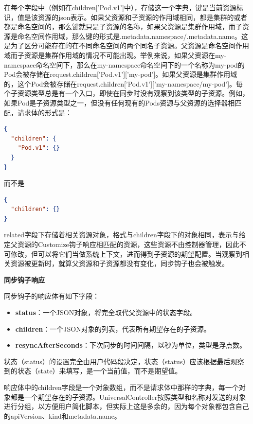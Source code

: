 \documentclass[macfonts,master]{njuthesis}
\begin{document}
在每个字段中（例如在children['Pod.v1']中），存储这一个字典，键是当前资源标识，值是该资源的json表示。如果父资源和子资源的作用域相同，都是集群的或者都是命名空间的，那么键就只是子资源的名称，如果父资源是集群作用域，而子资源是命名空间作用域，那么键的形式是{.metadata.namespace}/{.metadata.name}。这是为了区分可能存在的在不同命名空间的两个同名子资源。父资源是命名空间作用域而子资源是集群作用域的情况不可能出现。举例来说，如果父资源在my-namespace命名空间下，那么在my-namespace命名空间下的一个名称为my-pod的Pod会被存储在request.children['Pod.v1']['my-pod']。如果父资源是集群作用域的，这个Pod会被存储在request.children['Pod.v1']['my-namespace/my-pod']。每个子资源类型总是有一个入口，即使在同步时没有观察到该类型的子资源。例如，如果Pod是子资源类型之一，但没有任何现有的Pods资源与父资源的选择器相匹配，请求体的形式是：
\begin{lstlisting}[language=json,caption=请求体,label=listing:7]
{
  "children": {
    "Pod.v1": {}
  }
}
\end{lstlisting}
而不是
\begin{lstlisting}[language=json,caption=异常请求体,label=listing:8]
{
  "children": {}
}
\end{lstlisting}

related字段下存储着相关资源对象，格式与children字段下的对象相同，表示与给定父资源的Customize钩子响应相匹配的资源，这些资源不由控制器管理，因此不可修改，但可以将它们当做系统上下文，进而得到子资源的期望配置。当观察到相关资源被更新时，就算父资源和子资源都没有变化，同步钩子也会被触发。

\textbf{同步钩子响应}

同步钩子的响应体有如下字段：

\begin{itemize}
	\item \textbf{status}：一个JSON对象，将完全取代父资源中的状态字段。
	\item \textbf{children}：一个JSON对象的列表，代表所有期望存在的子资源。
	\item \textbf{resyncAfterSeconds}：下次同步的时间间隔，以秒为单位，类型是浮点数。
\end{itemize}

状态（status）的设置完全由用户代码段决定，状态（status）应该根据最后观察到的状态（state）来填写，是一个当前值，而不是期望值。

响应体中的children字段是一个对象数组，而不是请求体中那样的字典，每一个对象都是一个期望存在的子资源。UniversalController按照类型和名称对发送的对象进行分组，以方便用户简化脚本，但实际上这是多余的，因为每个对象都包含自己的apiVersion、kind和metadata.name。
\end{document}
